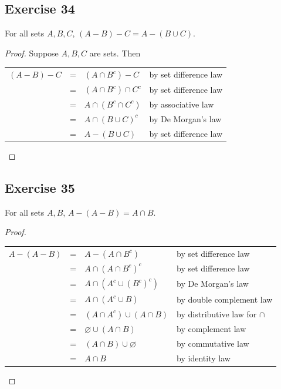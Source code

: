 \documentclass[14pt]{extarticle}
\newcommand{\es}{\varnothing}
\newcommand{\cy}{\color{cyan}}
\begin{document}
\subsection{Exercise 34}
For all sets $A, B, C$, \((A - B) - C = A - (B \cup C)\).

\begin{proof}
Suppose $A,B,C$ are sets. Then
\begin{center}
\begin{tabular}{rcll}
\((A - B) - C\) & = & \((A \cap B^c) - C\) & {\cy by set difference law} \\
\(\) & = & \((A \cap B^c) \cap C^c\) & {\cy by set difference law} \\
\(\) & = & \(A \cap (B^c \cap C^c)\) & {\cy by associative law} \\
\(\) & = & \(A \cap (B \cup C)^c\) & {\cy by De Morgan's law} \\
\(\) & = & \(A - (B \cup C)\) & {\cy by set difference law}
\end{tabular}
\end{center}
\end{proof}

\subsection{Exercise 35}
For all sets $A, B$, \(A - (A - B) = A \cap B\).

\begin{proof}
\begin{center}
\begin{tabular}{rcll}
\(A - (A - B)\) & = & \(A - (A \cap B^c)\) & {\cy by set difference law} \\
\(\) & = & \(A \cap (A \cap B^c)^c\) & {\cy by set difference law} \\
\(\) & = & \(A \cap (A^c \cup (B^c)^c)\) & {\cy by De Morgan's law} \\
\(\) & = & \(A \cap (A^c \cup B)\) & {\cy by double complement law} \\
\(\) & = & \((A \cap A^c) \cup (A \cap B)\) & {\cy by distributive law for $\cap$} \\
\(\) & = & \(\es \cup (A \cap B)\) & {\cy by complement law} \\
\(\) & = & \((A \cap B) \cup \es\) & {\cy by commutative law} \\
\(\) & = & \(A \cap B\) & {\cy by identity law}
\end{tabular}
\end{center}
\end{proof}
\end{document}
